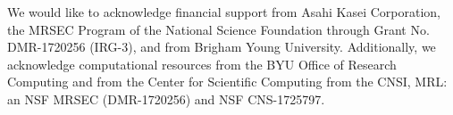 \documentclass[journal=mamobx, layout=twocolumn]{achemso}
\begin{document}
\begin{acknowledgement}
We would like to acknowledge financial support from Asahi Kasei Corporation, the MRSEC Program of the National Science Foundation through Grant No. DMR-1720256 (IRG-3), and from Brigham Young University. 
Additionally, we acknowledge computational resources from the BYU Office of Research Computing and from the Center for Scientific Computing from the CNSI, MRL: an NSF MRSEC (DMR-1720256) and NSF CNS-1725797.
\end{acknowledgement}


\end{document}
